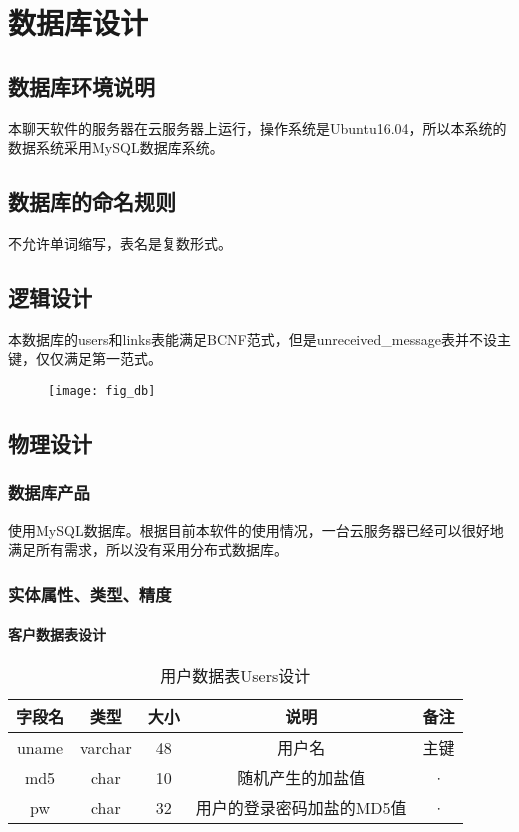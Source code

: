 \chapter{数据库设计}
\section{数据库环境说明}
本聊天软件的服务器在云服务器上运行，操作系统是Ubuntu16.04，所以本系统的数据系统采用MySQL数据库系统。

\section{数据库的命名规则}
不允许单词缩写，表名是复数形式。

\section{逻辑设计}
本数据库的users和links表能满足BCNF范式，但是unreceived\_message表并不设主键，仅仅满足第一范式。
\begin{figure}[h]
	\centering
	\texttt{[image: fig\_db]}
\end{figure}

\section{物理设计}
\subsection{数据库产品}
使用MySQL数据库。根据目前本软件的使用情况，一台云服务器已经可以很好地满足所有需求，所以没有采用分布式数据库。
\subsection{实体属性、类型、精度}
\subsubsection{客户数据表设计}
\begin{table}[htbp]
\centering
\caption{用户数据表Users设计} \label{tab:client-database}
\begin{tabular}{|c|c|c|c|c|}
    \hline
    字段名 & 类型 & 大小 & 说明 & 备注 \\
    \hline
    uname & varchar & 48 & 用户名 & 主键\\
    \hline
    md5 & char & 10 & 随机产生的加盐值 & ·\\
    \hline
    pw & char & 32 & 用户的登录密码加盐的MD5值 & · \\
    \hline
\end{tabular}
\end{table}

